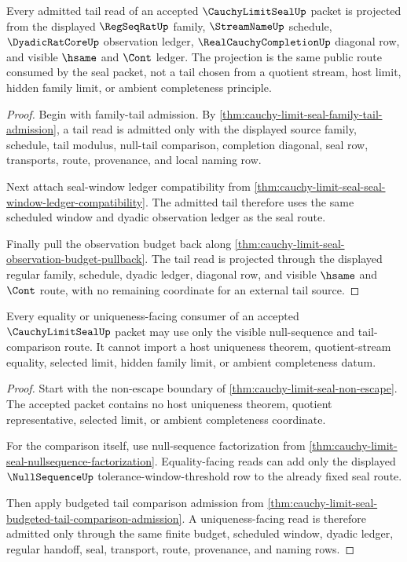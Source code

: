 \begin{theorem}
\label{thm:cauchy-limit-seal-tail-extraction}
Every admitted tail read of an accepted $\CauchyLimitSealUp$ packet is projected from the displayed $\RegSeqRatUp$ family, $\StreamNameUp$ schedule, $\DyadicRatCoreUp$ observation ledger, $\RealCauchyCompletionUp$ diagonal row, and visible $\hsame$ and $\Cont$ ledger. The projection is the same public route consumed by the seal packet, not a tail chosen from a quotient stream, host limit, hidden family limit, or ambient completeness principle.
\end{theorem}
\begin{proof}
Begin with family-tail admission. By \autoref{thm:cauchy-limit-seal-family-tail-admission}, a tail read is admitted only with the displayed source family, schedule, tail modulus, null-tail comparison, completion diagonal, seal row, transports, route, provenance, and local naming row.

Next attach seal-window ledger compatibility from \autoref{thm:cauchy-limit-seal-seal-window-ledger-compatibility}. The admitted tail therefore uses the same scheduled window and dyadic observation ledger as the seal route.

Finally pull the observation budget back along \autoref{thm:cauchy-limit-seal-observation-budget-pullback}. The tail read is projected through the displayed regular family, schedule, dyadic ledger, diagonal row, and visible $\hsame$ and $\Cont$ route, with no remaining coordinate for an external tail source.
\end{proof}

\begin{theorem}
\label{thm:cauchy-limit-seal-uniqueness-boundary}
Every equality or uniqueness-facing consumer of an accepted $\CauchyLimitSealUp$ packet may use only the visible null-sequence and tail-comparison route. It cannot import a host uniqueness theorem, quotient-stream equality, selected limit, hidden family limit, or ambient completeness datum.
\end{theorem}
\begin{proof}
Start with the non-escape boundary of \autoref{thm:cauchy-limit-seal-non-escape}. The accepted packet contains no host uniqueness theorem, quotient representative, selected limit, or ambient completeness coordinate.

For the comparison itself, use null-sequence factorization from \autoref{thm:cauchy-limit-seal-nullsequence-factorization}. Equality-facing reads can add only the displayed $\NullSequenceUp$ tolerance-window-threshold row to the already fixed seal route.

Then apply budgeted tail comparison admission from \autoref{thm:cauchy-limit-seal-budgeted-tail-comparison-admission}. A uniqueness-facing read is therefore admitted only through the same finite budget, scheduled window, dyadic ledger, regular handoff, seal, transport, route, provenance, and naming rows.
\end{proof}

